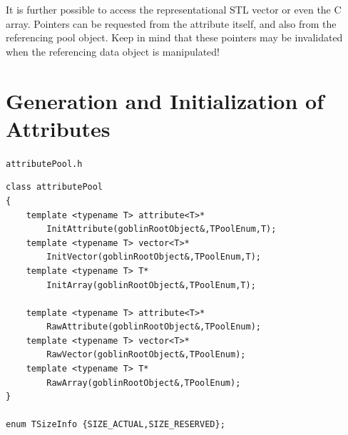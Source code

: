 \documentclass[a4paper,11pt,twoside]{book}
\begin{document}
\begin{multicols}{2}
It is further possible to access the representational STL vector or even the C
array. Pointers can be requested from the attribute itself, and also from the
referencing pool object. Keep in mind that these pointers may be invalidated when the
referencing data object is manipulated!


\section{Generation and Initialization of Attributes}
\myinclude\verb/attributePool.h/
\begin{mymethods}
\begin{verbatim}
class attributePool
{
    template <typename T> attribute<T>*
        InitAttribute(goblinRootObject&,TPoolEnum,T);
    template <typename T> vector<T>*
        InitVector(goblinRootObject&,TPoolEnum,T);
    template <typename T> T*
        InitArray(goblinRootObject&,TPoolEnum,T);

    template <typename T> attribute<T>*
        RawAttribute(goblinRootObject&,TPoolEnum);
    template <typename T> vector<T>*
        RawVector(goblinRootObject&,TPoolEnum);
    template <typename T> T*
        RawArray(goblinRootObject&,TPoolEnum);
}

enum TSizeInfo {SIZE_ACTUAL,SIZE_RESERVED};


\end{verbatim}
\end{mymethods}
\end{multicols}
\end{document}
